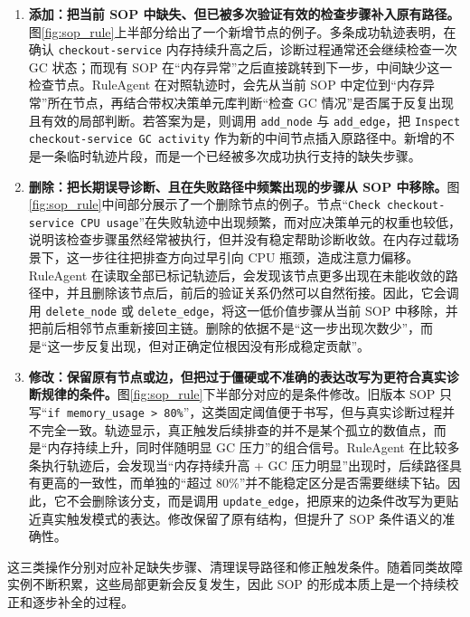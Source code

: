 \begin{enumerate}[label=（\arabic*）]
    \item \textbf{添加：把当前 SOP 中缺失、但已被多次验证有效的检查步骤补入原有路径。}图\ref{fig:sop_rule}上半部分给出了一个新增节点的例子。多条成功轨迹表明，在确认 \texttt{checkout-service} 内存持续升高之后，诊断过程通常还会继续检查一次 GC 状态；而现有 SOP 在“内存异常”之后直接跳转到下一步，中间缺少这一检查节点。RuleAgent 在对照轨迹时，会先从当前 SOP 中定位到“内存异常”所在节点，再结合带权决策单元库判断“检查 GC 情况”是否属于反复出现且有效的局部判断。若答案为是，则调用 \texttt{add\_node} 与 \texttt{add\_edge}，把 \texttt{Inspect checkout-service GC activity} 作为新的中间节点插入原路径中。新增的不是一条临时轨迹片段，而是一个已经被多次成功执行支持的缺失步骤。

    \item \textbf{删除：把长期误导诊断、且在失败路径中频繁出现的步骤从 SOP 中移除。}图\ref{fig:sop_rule}中间部分展示了一个删除节点的例子。节点“\texttt{Check checkout-service CPU usage}”在失败轨迹中出现频繁，而对应决策单元的权重也较低，说明该检查步骤虽然经常被执行，但并没有稳定帮助诊断收敛。在内存过载场景下，这一步往往把排查方向过早引向 CPU 瓶颈，造成注意力偏移。RuleAgent 在读取全部已标记轨迹后，会发现该节点更多出现在未能收敛的路径中，并且删除该节点后，前后的验证关系仍然可以自然衔接。因此，它会调用 \texttt{delete\_node} 或 \texttt{delete\_edge}，将这一低价值步骤从当前 SOP 中移除，并把前后相邻节点重新接回主链。删除的依据不是“这一步出现次数少”，而是“这一步反复出现，但对正确定位根因没有形成稳定贡献”。

    \item \textbf{修改：保留原有节点或边，但把过于僵硬或不准确的表达改写为更符合真实诊断规律的条件。}图\ref{fig:sop_rule}下半部分对应的是条件修改。旧版本 SOP 只写“\texttt{if memory\_usage > 80\%}”，这类固定阈值便于书写，但与真实诊断过程并不完全一致。轨迹显示，真正触发后续排查的并不是某个孤立的数值点，而是“内存持续上升，同时伴随明显 GC 压力”的组合信号。RuleAgent 在比较多条执行轨迹后，会发现当“内存持续升高 + GC 压力明显”出现时，后续路径具有更高的一致性，而单独的“超过 80\%”并不能稳定区分是否需要继续下钻。因此，它不会删除该分支，而是调用 \texttt{update\_edge}，把原来的边条件改写为更贴近真实触发模式的表达。修改保留了原有结构，但提升了 SOP 条件语义的准确性。
\end{enumerate}

这三类操作分别对应补足缺失步骤、清理误导路径和修正触发条件。随着同类故障实例不断积累，这些局部更新会反复发生，因此 SOP 的形成本质上是一个持续校正和逐步补全的过程。

